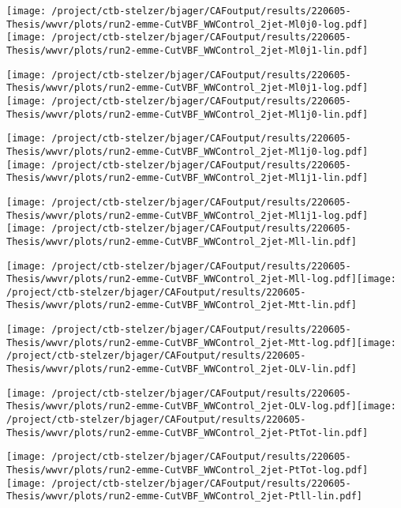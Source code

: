 \documentclass{article}
\begin{document}
\texttt{[image: /project/ctb-stelzer/bjager/CAFoutput/results/220605-Thesis/wwvr/plots/run2-emme-CutVBF\_WWControl\_2jet-Ml0j0-log.pdf]}\texttt{[image: /project/ctb-stelzer/bjager/CAFoutput/results/220605-Thesis/wwvr/plots/run2-emme-CutVBF\_WWControl\_2jet-Ml0j1-lin.pdf]}

\texttt{[image: /project/ctb-stelzer/bjager/CAFoutput/results/220605-Thesis/wwvr/plots/run2-emme-CutVBF\_WWControl\_2jet-Ml0j1-log.pdf]}\texttt{[image: /project/ctb-stelzer/bjager/CAFoutput/results/220605-Thesis/wwvr/plots/run2-emme-CutVBF\_WWControl\_2jet-Ml1j0-lin.pdf]}

\texttt{[image: /project/ctb-stelzer/bjager/CAFoutput/results/220605-Thesis/wwvr/plots/run2-emme-CutVBF\_WWControl\_2jet-Ml1j0-log.pdf]}\texttt{[image: /project/ctb-stelzer/bjager/CAFoutput/results/220605-Thesis/wwvr/plots/run2-emme-CutVBF\_WWControl\_2jet-Ml1j1-lin.pdf]}

\texttt{[image: /project/ctb-stelzer/bjager/CAFoutput/results/220605-Thesis/wwvr/plots/run2-emme-CutVBF\_WWControl\_2jet-Ml1j1-log.pdf]}\texttt{[image: /project/ctb-stelzer/bjager/CAFoutput/results/220605-Thesis/wwvr/plots/run2-emme-CutVBF\_WWControl\_2jet-Mll-lin.pdf]}

\texttt{[image: /project/ctb-stelzer/bjager/CAFoutput/results/220605-Thesis/wwvr/plots/run2-emme-CutVBF\_WWControl\_2jet-Mll-log.pdf]}\texttt{[image: /project/ctb-stelzer/bjager/CAFoutput/results/220605-Thesis/wwvr/plots/run2-emme-CutVBF\_WWControl\_2jet-Mtt-lin.pdf]}

\texttt{[image: /project/ctb-stelzer/bjager/CAFoutput/results/220605-Thesis/wwvr/plots/run2-emme-CutVBF\_WWControl\_2jet-Mtt-log.pdf]}\texttt{[image: /project/ctb-stelzer/bjager/CAFoutput/results/220605-Thesis/wwvr/plots/run2-emme-CutVBF\_WWControl\_2jet-OLV-lin.pdf]}

\texttt{[image: /project/ctb-stelzer/bjager/CAFoutput/results/220605-Thesis/wwvr/plots/run2-emme-CutVBF\_WWControl\_2jet-OLV-log.pdf]}\texttt{[image: /project/ctb-stelzer/bjager/CAFoutput/results/220605-Thesis/wwvr/plots/run2-emme-CutVBF\_WWControl\_2jet-PtTot-lin.pdf]}

\texttt{[image: /project/ctb-stelzer/bjager/CAFoutput/results/220605-Thesis/wwvr/plots/run2-emme-CutVBF\_WWControl\_2jet-PtTot-log.pdf]}\texttt{[image: /project/ctb-stelzer/bjager/CAFoutput/results/220605-Thesis/wwvr/plots/run2-emme-CutVBF\_WWControl\_2jet-Ptll-lin.pdf]}
\end{document}
